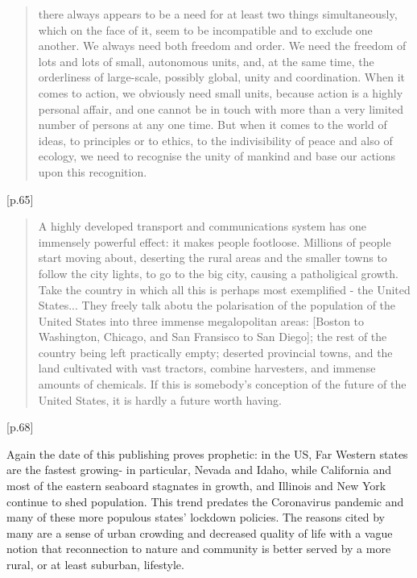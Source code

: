 \begin{quote}
there always appears to be a need for at least two things simultaneously, which on the face of it, seem to be incompatible and to exclude one another. We always need both freedom and order. We need the freedom of lots and lots of small, autonomous units, and, at the same time, the orderliness of large-scale, possibly global, unity and coordination. When it comes to action, we obviously need small units, because action is a highly personal affair, and one cannot be in touch with more than a very limited number of persons at any one time. But when it comes to the world of ideas, to principles or to ethics, to the indivisibility of peace and also of ecology, we need to recognise the unity of mankind and base our actions upon this recognition.
\end{quote} [p.65]

\begin{quote}
A highly developed transport and communications system has one immensely powerful effect: it makes people footloose. Millions of people start moving about, deserting the rural areas and the smaller towns to follow the city lights, to go to the big city, causing a patholigical growth. Take the country in which all this is perhaps most exemplified - the United States... They freely talk abotu the polarisation of the population of the United States into three immense megalopolitan areas: [Boston to Washington, Chicago, and San Fransisco to San Diego]; the rest of the country being left practically empty; deserted provincial towns, and the land cultivated with vast tractors, combine harvesters, and immense amounts of chemicals. If this is somebody's conception of the future of the United States, it is hardly a future worth having.
\end{quote}[p.68]

Again the date of this publishing proves prophetic: in the US, Far Western states are the fastest growing- in particular, Nevada and Idaho, while California and most of the eastern seaboard stagnates in growth, and Illinois and New York continue to shed population. This trend predates the Coronavirus pandemic and many of these more populous states' lockdown policies. The reasons cited by many are a sense of urban crowding and decreased quality of life with a vague notion that reconnection to nature and community is better served by a more rural, or at least suburban, lifestyle.

